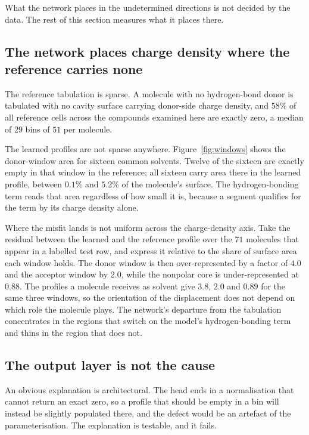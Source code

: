 What the network places in the undetermined directions is not decided by the data. The rest of this
section measures what it places there.

\subsection{The network places charge density where the reference carries none}
\label{sec:windows}

The reference tabulation is sparse. A molecule with no hydrogen-bond donor is tabulated with no
cavity surface carrying donor-side charge density, and $58\%$ of all reference cells across the
compounds examined here are exactly zero, a median of $29$ bins of $51$ per molecule.

The learned profiles are not sparse anywhere. Figure~\ref{fig:windows} shows the donor-window area
for sixteen common solvents. Twelve of the sixteen are exactly empty in that window in the
reference; all sixteen carry area there in the learned profile, between $0.1\%$ and $5.2\%$ of the
molecule's surface. The hydrogen-bonding term reads that area regardless of how small it is,
because a segment qualifies for the term by its charge density alone.

Where the misfit lands is not uniform across the charge-density axis. Take the residual between the
learned and the reference profile over the $71$ molecules that appear in a labelled test row, and
express it relative to the share of surface area each window holds. The donor window is then
over-represented by a factor of $4.0$ and the acceptor window by $2.0$, while the nonpolar core is
under-represented at $0.88$. The profiles a molecule receives as solvent give $3.8$, $2.0$ and
$0.89$ for the same three windows, so the orientation of the displacement does not depend on which
role the molecule plays. The network's departure from the tabulation concentrates in the regions
that switch on the model's hydrogen-bonding term and thins in the region that does not.

\subsection{The output layer is not the cause}
\label{sec:pedestal}

An obvious explanation is architectural. The head ends in a normalisation that cannot return an
exact zero, so a profile that should be empty in a bin will instead be slightly populated there,
and the defect would be an artefact of the parameterisation. The explanation is testable, and it
fails.

